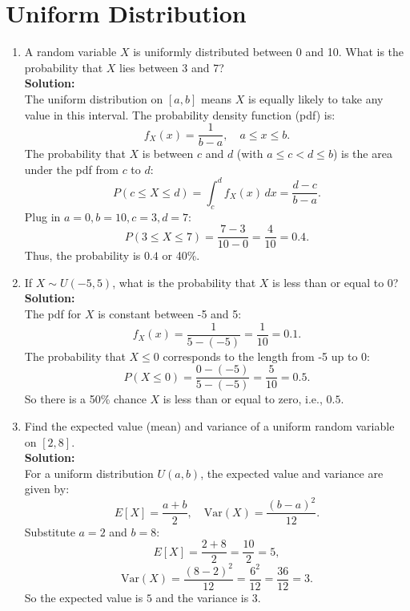 \documentclass{book}
\begin{document}
\section*{Uniform Distribution}

\begin{enumerate}[label=Exercise \arabic*:]
    \item A random variable \(X\) is uniformly distributed between 0 and 10. What is the probability that \(X\) lies between 3 and 7? \\
    \textbf{Solution:} \\
    The uniform distribution on \([a,b]\) means \(X\) is equally likely to take any value in this interval. The probability density function (pdf) is:
    \[
    f_X(x) = \frac{1}{b-a}, \quad a \leq x \leq b.
    \]
    The probability that \(X\) is between \(c\) and \(d\) (with \(a \leq c < d \leq b\)) is the area under the pdf from \(c\) to \(d\):
    \[
    P(c \leq X \leq d) = \int_c^d f_X(x) \, dx = \frac{d - c}{b - a}.
    \]
    Plug in \(a=0, b=10, c=3, d=7\):
    \[
    P(3 \leq X \leq 7) = \frac{7 - 3}{10 - 0} = \frac{4}{10} = 0.4.
    \]
    Thus, the probability is \(\boxed{0.4}\) or 40\%.

    \item If \(X \sim U(-5,5)\), what is the probability that \(X\) is less than or equal to 0? \\
    \textbf{Solution:} \\
    The pdf for \(X\) is constant between -5 and 5:
    \[
    f_X(x) = \frac{1}{5 - (-5)} = \frac{1}{10} = 0.1.
    \]
    The probability that \(X \leq 0\) corresponds to the length from -5 up to 0:
    \[
    P(X \leq 0) = \frac{0 - (-5)}{5 - (-5)} = \frac{5}{10} = 0.5.
    \]
    So there is a 50\% chance \(X\) is less than or equal to zero, i.e., \(\boxed{0.5}\).

    \item Find the expected value (mean) and variance of a uniform random variable on \([2,8]\). \\
    \textbf{Solution:} \\
    For a uniform distribution \(U(a,b)\), the expected value and variance are given by:
    \[
    E[X] = \frac{a + b}{2}, \quad \mathrm{Var}(X) = \frac{(b - a)^2}{12}.
    \]
    Substitute \(a=2\) and \(b=8\):
    \[
    E[X] = \frac{2 + 8}{2} = \frac{10}{2} = 5,
    \]
    \[
    \mathrm{Var}(X) = \frac{(8 - 2)^2}{12} = \frac{6^2}{12} = \frac{36}{12} = 3.
    \]
    So the expected value is \(\boxed{5}\) and the variance is \(\boxed{3}\).
\end{enumerate}
\end{document}
